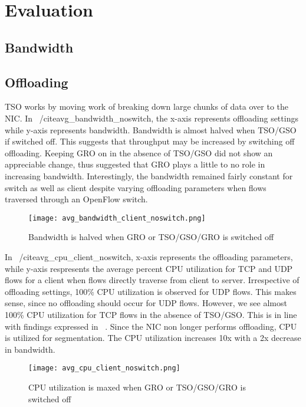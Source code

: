\section{Evaluation} 
\subsection{Bandwidth} 

\subsection{Offloading} 
TSO works by moving work of breaking down large chunks of data over to the NIC.
In ~/cite{avg_bandwidth_noswitch}, the x-axis represents offloading settings
while y-axis represents bandwidth. Bandwidth is almost halved
when TSO/GSO if switched off. This suggests that throughput may be increased by
switching off offloading. Keeping GRO on in the absence of TSO/GSO did not show
an appreciable change, thus suggested that GRO plays a little to no role in
increasing bandwidth. Interestingly, the bandwidth remained fairly constant for
switch as well as client despite varying offloading parameters when flows
traversed through an OpenFlow switch. 
\begin{figure}[t]
\texttt{[image: avg\_bandwidth\_client\_noswitch.png]}
\caption{Bandwidth is halved when GRO or TSO/GSO/GRO is switched off}
\label{fig:avg_bandwidth_client_noswitch} \end{figure}


In ~/cite{avg_cpu_client_noswitch}, x-axis represents the offloading parameters,
   while y-axis respresents the average percent CPU utilization for TCP and UDP
   flows for a client when flows directly traverse from client to server.
   Irrespective of offloading settings, 100\% CPU utilization is observed for
   UDP flows. This makes sense, since no offloading should occur for UDP flows.
   However, we see almost 100\% CPU utilization for TCP flows in the absence of
   TSO/GSO. This is in line with findings expressed in
   ~\cite{avg_bandwidth_client_noswitch}. Since the NIC non longer performs
   offloading, CPU is utilized for segmentation. The CPU utilization increases
   10x with a 2x decrease in bandwidth. 
\begin{figure}[t] 
\texttt{[image: avg\_cpu\_client\_noswitch.png]}
\caption{CPU utilization is maxed when GRO or TSO/GSO/GRO is switched off}
\label{fig:avg_cpu_client_noswitch} 
\end{figure}

